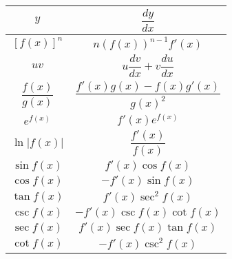 \documentclass{article}[18pt]
\begin{document}
\begin{center}

\begin{Large}

\begin{tabular}{|c|c|}
 \hline
 $y$&$\dfrac{dy}{dx}$\\
 \hline
 $[f(x)]^n$&$n(f(x))^{n-1}f'(x)$\\
 \hline
 $uv$&$u\dfrac{dv}{dx}+v\dfrac{du}{dx}$\\
 \hline
 $\dfrac{f(x)}{g(x)}$&$\dfrac{f'(x)g(x)-f(x)g'(x)}{g(x)^2}$\\
 \hline
 $e^{f(x)}$&$f'(x)e^{f(x)}$\\
 \hline
 $\ln|f(x)|$&$\dfrac{f'(x)}{f(x)}$\\
 \hline
 $\sin f(x)$&$f'(x)\cos f(x)$\\
 \hline
 $\cos f(x)$&$-f'(x)\sin f(x)$\\
 \hline
 $\tan f(x)$&$f'(x)\sec^2f(x)$\\
 \hline
 $\csc f(x)$&$-f'(x)\csc f(x)\cot f(x)$\\
 \hline
 $\sec f(x)$&$f'(x)\sec f(x)\tan f(x)$\\
 \hline
 $\cot f(x)$&$-f'(x)\csc^2f(x)$\\
 \hline
\end{tabular}
\end{Large}
\end{center}
\end{document}

